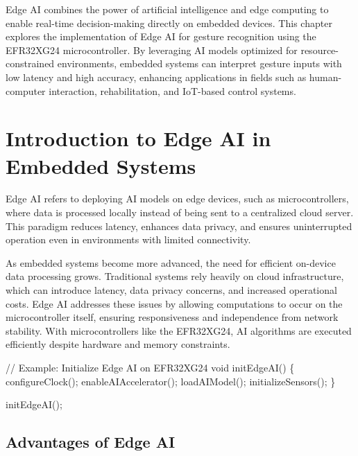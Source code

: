\documentclass[
  9pt,
  letterpaper,
  abstract,
  titlepage]{scrbook}
\newenvironment{Shaded}{\begin{snugshade}}{\end{snugshade}}
\newcommand{\CommentTok}[1]{\textcolor[rgb]{0.37,0.37,0.37}{#1}}
\newcommand{\DataTypeTok}[1]{\textcolor[rgb]{0.68,0.00,0.00}{#1}}
\newcommand{\NormalTok}[1]{\textcolor[rgb]{0.00,0.23,0.31}{#1}}
\newcommand{\OperatorTok}[1]{\textcolor[rgb]{0.37,0.37,0.37}{#1}}
\begin{document}
Edge AI combines the power of artificial intelligence and edge computing
to enable real-time decision-making directly on embedded devices. This
chapter explores the implementation of Edge AI for gesture recognition
using the EFR32XG24 microcontroller. By leveraging AI models optimized
for resource-constrained environments, embedded systems can interpret
gesture inputs with low latency and high accuracy, enhancing
applications in fields such as human-computer interaction,
rehabilitation, and IoT-based control systems.

\section{Introduction to Edge AI in Embedded
Systems}\label{introduction-to-edge-ai-in-embedded-systems}

Edge AI refers to deploying AI models on edge devices, such as
microcontrollers, where data is processed locally instead of being sent
to a centralized cloud server. This paradigm reduces latency, enhances
data privacy, and ensures uninterrupted operation even in environments
with limited connectivity.

As embedded systems become more advanced, the need for efficient
on-device data processing grows. Traditional systems rely heavily on
cloud infrastructure, which can introduce latency, data privacy
concerns, and increased operational costs. Edge AI addresses these
issues by allowing computations to occur on the microcontroller itself,
ensuring responsiveness and independence from network stability. With
microcontrollers like the EFR32XG24, AI algorithms are executed
efficiently despite hardware and memory constraints.

\begin{Shaded}
\begin{Highlighting}[]
\CommentTok{// Example: Initialize Edge AI on EFR32XG24}
\DataTypeTok{void}\NormalTok{ initEdgeAI}\OperatorTok{()} \OperatorTok{\{}
\NormalTok{    configureClock}\OperatorTok{();}
\NormalTok{    enableAIAccelerator}\OperatorTok{();}
\NormalTok{    loadAIModel}\OperatorTok{();}
\NormalTok{    initializeSensors}\OperatorTok{();}
\OperatorTok{\}}

\NormalTok{initEdgeAI}\OperatorTok{();}
\end{Highlighting}
\end{Shaded}

\subsection{Advantages of Edge AI}\label{advantages-of-edge-ai}
\end{document}
